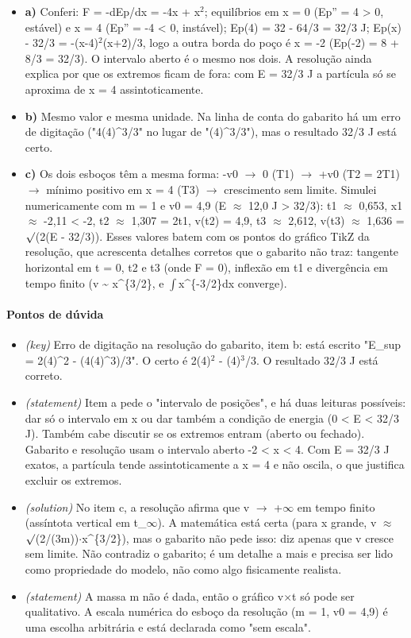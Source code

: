 \documentclass{article}%
\begin{document}
\begin{itemize}%
\item%
\textbf{a)} Conferi: F = -dEp/dx = -4x + x$^2$; equilíbrios em x = 0 (Ep'' = 4 > 0, estável) e x = 4 (Ep'' = -4 < 0, instável); Ep(4) = 32 - 64/3 = 32/3 J; Ep(x) - 32/3 = -(x-4)$^2$(x+2)/3, logo a outra borda do poço é x = -2 (Ep(-2) = 8 + 8/3 = 32/3). O intervalo aberto é o mesmo nos dois. A resolução ainda explica por que os extremos ficam de fora: com E = 32/3 J a partícula só se aproxima de x = 4 assintoticamente.%
\item%
\textbf{b)} Mesmo valor e mesma unidade. Na linha de conta do gabarito há um erro de digitação ("4(4)\^{}3/3" no lugar de "(4)\^{}3/3"), mas o resultado 32/3 J está certo.%
\item%
\textbf{c)} Os dois esboços têm a mesma forma: -v0 $\to$ 0 (T1) $\to$ +v0 (T2 = 2T1) $\to$ mínimo positivo em x = 4 (T3) $\to$ crescimento sem limite. Simulei numericamente com m = 1 e v0 = 4,9 (E $\approx$ 12,0 J > 32/3): t1 $\approx$ 0,653, x1 $\approx$ -2,11 < -2, t2 $\approx$ 1,307 = 2t1, v(t2) = 4,9, t3 $\approx$ 2,612, v(t3) $\approx$ 1,636 = $\surd$(2(E - 32/3)). Esses valores batem com os pontos do gráfico TikZ da resolução, que acrescenta detalhes corretos que o gabarito não traz: tangente horizontal em t = 0, t2 e t3 (onde F = 0), inflexão em t1 e divergência em tempo finito (v \textasciitilde{} x\^{}\{3/2\}, e $\int$x\^{}\{-3/2\}dx converge).%
\end{itemize}%
\paragraph{Pontos de dúvida}%
\begin{itemize}%
\item%
\textit{(key)} Erro de digitação na resolução do gabarito, item b: está escrito "E\_sup = 2(4)\^{}2 - (4(4)\^{}3)/3". O certo é 2(4)$^2$ - (4)$^3$/3. O resultado 32/3 J está correto.%
\item%
\textit{(statement)} Item a pede o "intervalo de posições", e há duas leituras possíveis: dar só o intervalo em x ou dar também a condição de energia (0 < E < 32/3 J). Também cabe discutir se os extremos entram (aberto ou fechado). Gabarito e resolução usam o intervalo aberto -2 < x < 4. Com E = 32/3 J exatos, a partícula tende assintoticamente a x = 4 e não oscila, o que justifica excluir os extremos.%
\item%
\textit{(solution)} No item c, a resolução afirma que v $\to$ +$\infty$ em tempo finito (assíntota vertical em t\_$\infty$). A matemática está certa (para x grande, v $\approx$ $\surd$(2/(3m))$\cdot$x\^{}\{3/2\}), mas o gabarito não pede isso: diz apenas que v cresce sem limite. Não contradiz o gabarito; é um detalhe a mais e precisa ser lido como propriedade do modelo, não como algo fisicamente realista.%
\item%
\textit{(statement)} A massa m não é dada, então o gráfico v$\times$t só pode ser qualitativo. A escala numérica do esboço da resolução (m = 1, v0 = 4,9) é uma escolha arbitrária e está declarada como "sem escala".%
\end{itemize}%
\end{document}
